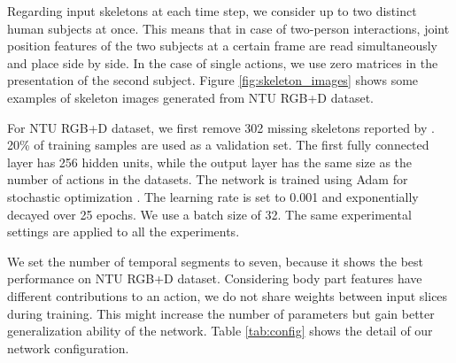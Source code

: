 \documentclass{bmvc2k}
\begin{document}
Regarding input skeletons at each time step, we consider up to two distinct human subjects at once. This means that in case of two-person interactions, joint position features of the two subjects at a certain frame are read simultaneously and place side by side. In the case of single actions, we use zero matrices in the presentation of the second subject. Figure \ref{fig:skeleton_images} shows some examples of skeleton images generated from NTU RGB+D dataset.

For NTU RGB+D dataset, we first remove 302 missing skeletons reported by \cite{shahroudy2016ntu}. 20\% of training samples are used as a validation set. The first fully connected layer has 256 hidden units, while the output layer has the same size as the number of actions in the datasets. The network is trained using Adam for stochastic optimization \cite{kingma2014adam}. The learning rate is set to 0.001 and exponentially decayed over 25 epochs. We use a batch size of 32. The same experimental settings are applied to all the experiments. 

We set the number of temporal segments to seven, because it shows the best performance on NTU RGB+D dataset. Considering body part features have different contributions to an action, we do not share weights between input slices during training. This might increase the number of parameters but gain better generalization ability of the network. Table \ref{tab:config} shows the detail of our network configuration. 
\end{document}
